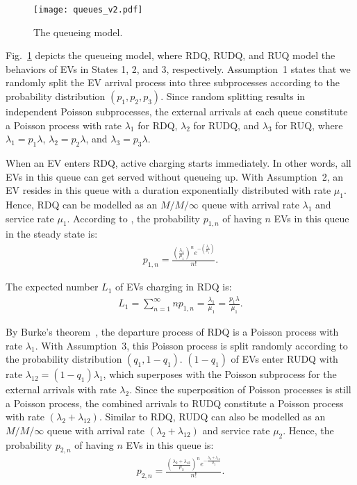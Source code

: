 \documentclass[journal]{IEEEtran}
\begin{document}
\begin{figure}[!t]
\centering
\texttt{[image: queues\_v2.pdf]} 
\caption{The queueing model.}
\label{fig:t_queues}
\end{figure}

Fig.~\ref{fig:t_queues} depicts the queueing model, where RDQ, RUDQ, and RUQ
model the behaviors of EVs in States 1, 2, and 3, respectively.  Assumption~1
states that we randomly split the EV arrival process into three subprocesses
according to the probability distribution $(p_1, p_2, p_3)$.  Since random
splitting results in independent Poisson subprocesses, the external arrivals
at each queue constitute a Poisson process with rate $\lambda_1$ for RDQ,
$\lambda_2$ for RUDQ, and $\lambda_3$ for RUQ, where $\lambda_1 = p_1 \lambda$,
$\lambda_2 = p_2 \lambda$, and $\lambda_3 = p_3 \lambda$.

When an EV enters RDQ, active charging starts immediately.  In other words, all
EVs in this queue can get served without queueing up.  With Assumption~2, an
EV resides in this queue with a duration exponentially distributed with rate
$\mu_1$.  Hence, RDQ can be modelled as an $M/M/\infty$ queue with arrival rate
$\lambda_1$ and service rate $\mu_1$.  According to \cite{queueingtheory}, the
probability $p_{1, n}$ of having $n$ EVs in this queue in the steady state is:
\begin{align}
p_{1,n} = \frac{(\frac{\lambda_1}{\mu_1})^n e^{-(\frac{\lambda_1}{\mu_1})}}{n!}.
\end{align}

The expected number $L_1$ of EVs charging in RDQ is:
\begin{align}
L_1 = \sum_{n = 1}^{\infty}{np_{1,n}}
    = \frac{\lambda_1}{\mu_1} = \frac{p_1 \lambda}{\mu_1}.
\label{L_1}
\end{align} 

By Burke's theorem~\cite{datanetworks}, the departure process of RDQ is a
Poisson process with rate $\lambda_1$.  With Assumption~3, this Poisson process
is split randomly according to the probability distribution $(q_1, 1 - q_1)$.
$(1 - q_1)$ of EVs enter RUDQ with rate $\lambda_{12} = (1 - q_1) \lambda_1$,
which superposes with the Poisson subprocess for the external arrivals with
rate $\lambda_2$.  Since the superposition of Poisson processes is still a
Poisson process, the combined arrivals to RUDQ constitute a Poisson process with
rate $(\lambda_2 + \lambda_{12})$.  Similar to RDQ, RUDQ can also be modelled
as an $M/M/\infty$ queue with arrival rate $(\lambda_2 + \lambda_{12})$ and
 service rate $\mu_2$.  Hence, the probability $p_{2, n}$ of having $n$ EVs
in this queue is:
\begin{align}
p_{2,n} = \frac{(\frac{\lambda_2 + \lambda_{12}}{\mu_2})^n
	  e^{- \frac{\lambda_2 + \lambda_{12}}{\mu_2}}}{n!}.
\end{align}
\end{document}
